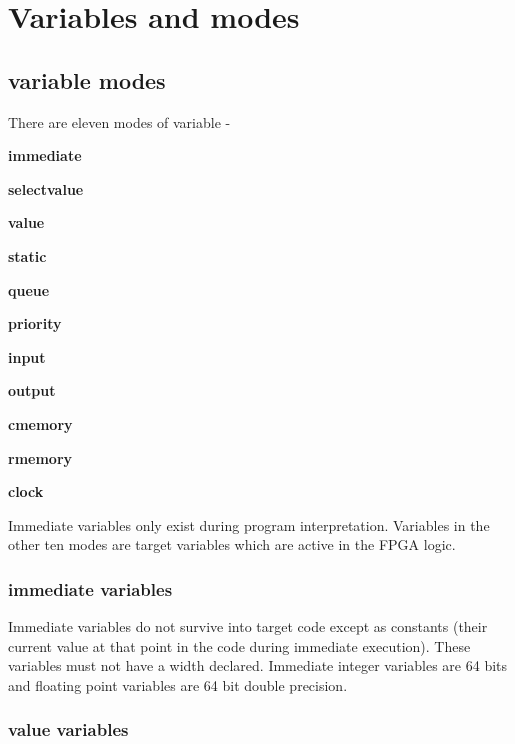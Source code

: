     \section{Variables and modes}

        \subsection{variable modes}

            There are eleven modes of variable -
            \blist
            \item    {\bf immediate}
            \item    {\bf selectvalue}
            \item    {\bf value}
            \item    {\bf static}
            \item    {\bf queue}
            \item    {\bf priority}
            \item    {\bf input}
            \item    {\bf output}
            \item    {\bf cmemory}
            \item    {\bf rmemory}
            \item    {\bf clock}
            \blend

            Immediate variables only exist during program interpretation.
            Variables in the other ten modes are target variables which
            are active in the FPGA logic.


            \subsubsection{immediate variables}

                Immediate variables do not survive into target code except as
                constants (their current value at that point in the code during
                immediate execution). These variables must not have a width
                declared. Immediate integer variables are 64 bits and floating
                point variables are 64 bit double precision.

            \subsubsection{value variables}

